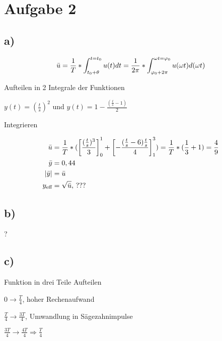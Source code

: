 \documentclass[../../document.tex]{subfiles}
\begin{document}
\section*{Aufgabe 2}

\subsection*{a)}

\begin{equation*}
    \bar{u} = \frac{1}{T} * \int_{t_{\textrm{0}} + \theta}^{t = t_{\textrm{0}}} u(t) dt = \frac{1}{2\pi} * \int_{\varphi_{\textrm{0}} + 2\pi}^{\omega t = \varphi_{\textrm{0}}} u(\omega t) d (\omega t) 
\end{equation*}

Aufteilen in 2 Integrale der Funktionen

\(y(t) = (\frac{t}{s})^2\) und \(y(t) = 1 - \frac{(\frac{t}{s} - 1)}{2}\)

Integrieren

\begin{equation*}
    \begin{split}
        \bar{u} &= \frac{1}{T} * (\left[\frac{(\frac{t}{s})^3}{3}\right]_0^1 + \left[-\frac{(\frac{t}{s}-6)\frac{t}{s}}{4}\right]_1^3) = \frac{1}{T} * (\frac{1}{3} + 1) = \frac{4}{9}\\
        \bar{y} &= 0,44\\
        \left\lvert\bar{y}\right\rvert &= \bar{u} \\
        y_{\textrm{eff}} &= \sqrt{\bar{u}}\text{, ???}\\
    \end{split}
\end{equation*}

\subsection*{b)}

?

\subsection*{c)}

Funktion in drei Teile Aufteilen

\(0 \rightarrow \frac{T}{4}\), hoher Rechenaufwand

\(\frac{T}{4} \rightarrow \frac{3T}{4}\), Umwandlung in Sägezahnimpulse

\(\frac{3T}{4} \rightarrow \frac{4T}{4} \Rightarrow \frac{T}{4}\)
\end{document}
